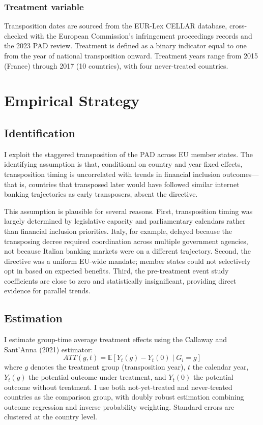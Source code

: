 \documentclass[12pt]{article}
\newcommand{\E}{\mathbb{E}}
\begin{document}
\subsubsection*{Treatment variable} Transposition dates are sourced from the EUR-Lex CELLAR database, cross-checked with the European Commission's infringement proceedings records and the 2023 PAD review. Treatment is defined as a binary indicator equal to one from the year of national transposition onward. Treatment years range from 2015 (France) through 2017 (10 countries), with four never-treated countries.



\section{Empirical Strategy}
\label{sec:strategy}

\subsection{Identification}

I exploit the staggered transposition of the PAD across EU member states. The identifying assumption is that, conditional on country and year fixed effects, transposition timing is uncorrelated with trends in financial inclusion outcomes---that is, countries that transposed later would have followed similar internet banking trajectories as early transposers, absent the directive.

This assumption is plausible for several reasons. First, transposition timing was largely determined by legislative capacity and parliamentary calendars rather than financial inclusion priorities. Italy, for example, delayed because the transposing decree required coordination across multiple government agencies, not because Italian banking markets were on a different trajectory. Second, the directive was a uniform EU-wide mandate; member states could not selectively opt in based on expected benefits. Third, the pre-treatment event study coefficients are close to zero and statistically insignificant, providing direct evidence for parallel trends.

\subsection{Estimation}

I estimate group-time average treatment effects using the Callaway and Sant'Anna (2021) estimator:
\begin{equation}
ATT(g,t) = \E[Y_t(g) - Y_t(0) \mid G_i = g]
\end{equation}
where $g$ denotes the treatment group (transposition year), $t$ the calendar year, $Y_t(g)$ the potential outcome under treatment, and $Y_t(0)$ the potential outcome without treatment. I use both not-yet-treated and never-treated countries as the comparison group, with doubly robust estimation combining outcome regression and inverse probability weighting. Standard errors are clustered at the country level.
\end{document}
